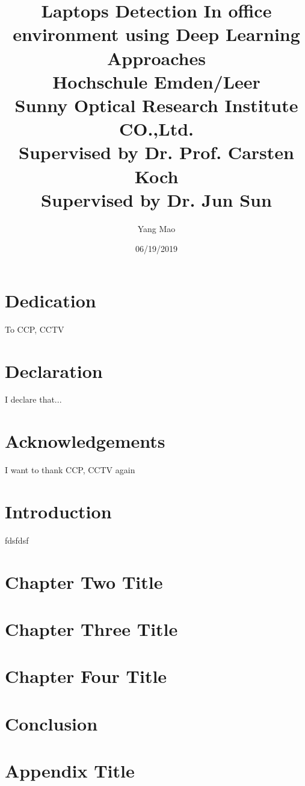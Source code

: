 \documentclass[12pt]{report}
\title{
{Laptops Detection In office environment using Deep Learning Approaches}\\
{\large Hochschule Emden/Leer}\\
{\large Sunny Optical Research Institute CO.,Ltd.}\\
{\large Supervised by Dr. Prof. Carsten Koch}\\
{\large Supervised by Dr. Jun Sun}}
\author{Yang Mao}
\date{06/19/2019}
\begin{document}




\chapter*{Dedication}
To CCP, CCTV

\chapter*{Declaration}
I declare that...
\chapter*{Acknowledgements}
I want to thank CCP, CCTV again
\tableofcontents

\chapter{Introduction}

fdsfdsf\nocite{*latexcompanion}


\chapter{Chapter Two Title}


\chapter{Chapter Three Title}


\chapter{Chapter Four Title}


\chapter{Conclusion}


\appendix
\chapter{Appendix Title}

\end{document}

